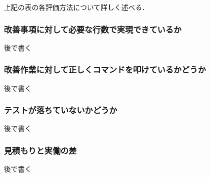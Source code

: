 上記の表の各評価方法について詳しく述べる．

\subsubsection{改善事項に対して必要な行数で実現できているか}

後で書く

\subsubsection{改善作業に対して正しくコマンドを叩けているかどうか}

後で書く

\subsubsection{テストが落ちていないかどうか}

後で書く

\subsubsection{見積もりと実働の差}

後で書く
